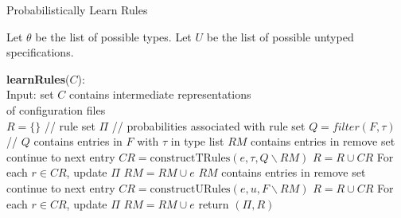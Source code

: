 \begin{algorithm}
\caption{Probabilistically Learn Rules}
\label{alg:plearn}
  Let $\theta$ be the list of possible types. 
  Let $U$ be the list of possible untyped specifications. 
  \begin{algorithmic}[1]
  \State \textbf{learnRules}($C$):\\

  Input: set $C$ contains intermediate representations\\ 
     \qquad \enspace \enspace of configuration files\\

    \State $R = \{\}$ // rule set
    \State $\Pi$ // probabilities associated with rule set
        \State $Q = filter(F,\tau)$ 
        \State // $Q$ contains entries in $F$ with $\tau$ in type list
        \State $RM$ contains entries in remove set
                        \State continue to next entry
                        \Else 
                        \State $CR = \textrm{constructTRules}(e, \tau, Q \backslash RM)$
                        \State $R = R  \cup CR$
                        \State For each $r \in CR$, update $\Pi$ 
               \EndIf
               \State $RM = RM \cup e$
        \EndFor
     \EndFor
        \State $RM$ contains entries in remove set
                        \State continue to next entry
                        \Else 
                        \State $CR = \textrm{constructURules}(e, u, F \backslash RM)$
                        \State $R = R  \cup CR$
                        \State For each $r \in CR$, update $\Pi$ 
               \EndIf
               \State $RM = RM \cup e$
        \EndFor
     \EndFor
    \EndFor
    \EndFor
    \State return $(\Pi,R)$
  \end{algorithmic}
\end{algorithm}


